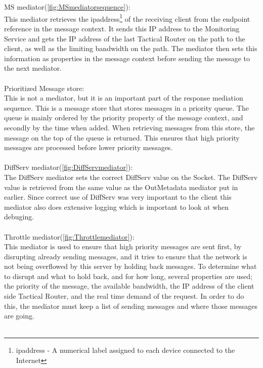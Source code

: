 \\\\
MS mediator(\ref{fig:MSmediatorsequence}):\\
    This mediator retrieves the \gls{ipaddress}\footnote{\gls{ipaddress} - A numerical label assigned to each device connected to the Internet} of the receiving client from the endpoint reference in the message context. It sends this IP address to the Monitoring Service and gets the IP address of the last Tactical Router on the path to the client, as well as the limiting bandwidth on the path. The mediator then sets this information as properties in the message context before sending the message to the next mediator.
\\\\
Prioritized Message store:\\
    This is not a mediator, but it is an important part of the response mediation sequence. This is a message store that stores messages in a priority queue. The queue is mainly ordered by the priority property of the message context, and secondly by the time when added. When retrieving messages from this store, the message on the top of the queue is returned. This ensures that high priority messages are processed before lower priority messages.
\\\\
DiffServ mediator(\ref{fig:DiffServmediator}):\\
	The DiffServ mediator sets the correct DiffServ value on the Socket. The DiffServ value is retrieved from the same value as the OutMetadata mediator put in earlier. Since correct use of DiffServ was very important to the client this mediator also does extensive logging which is important to look at when debuging.
\\\\
Throttle mediator(\ref{fig:Throttlemediator}):\\
    This mediator is used to ensure that high priority messages are sent first, by disrupting already sending messages, and it tries to ensure that the network is not being overflowed by this server by holding back messages. To determine what to disrupt and what to hold back, and for how long, several properties are used; the priority of the message, the available bandwidth, the IP address of the client side Tactical Router, and the real time demand of the request. In order to do this, the mediator must keep a list of sending messages and where those messages are going.
\\\\
